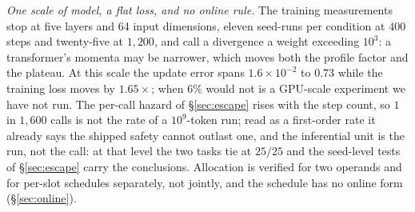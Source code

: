 \emph{One scale of model, a flat loss, and no online rule.}  The training measurements stop
at five layers and 64 input dimensions, eleven seed-runs per condition at $400$ steps and
twenty-five at $1{,}200$, and call a
divergence a weight exceeding $10^{3}$: a transformer's momenta may be narrower, which
moves both the profile factor and the plateau.  At this scale the update
error spans $1.6\times10^{-2}$ to $0.73$ while the training loss moves by $1.65\times$;
when $6\%$ would not is a GPU-scale experiment we have not run.  The per-call hazard of
\S\ref{sec:escape} rises with the step count, so $1$ in $1{,}600$ calls is not the rate of a
$10^{9}$-token run; read as a first-order rate it already says the shipped safety cannot
outlast one, and the inferential unit is the run, not the call: at that level the two tasks
tie at $25/25$ and the seed-level tests of \S\ref{sec:escape} carry the conclusions.
Allocation is verified
for two operands and for per-slot schedules separately, not jointly, and the schedule has
no online form (\S\ref{sec:online}).
